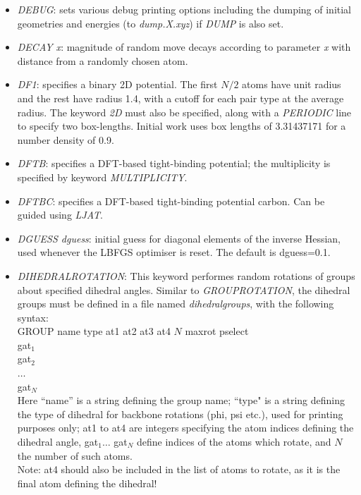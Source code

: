 \documentclass[12pt,a4paper,dvips]{article}
\begin{document}
\begin{itemize}
\item {\it DEBUG\/}: sets various debug printing options including the dumping of initial
geometries and energies (to {\it dump.X.xyz\/}) if {\it DUMP} is also set.

\item {\it DECAY x\/}: magnitude of random move decays according to parameter
{\it x\/} with distance from a randomly chosen atom.

\item {\it DF1\/}: specifies a binary 2D potential.
The first $N/2$ atoms have unit radius and the rest
have radius 1.4, with a cutoff for each pair type at the
average radius.
The keyword {\it 2D\/} must also be specified, along with a
{\it PERIODIC\/} line to specify two box-lengths.
Initial work uses box lengths of 3.31437171 for a number density of 0.9.

\item {\it DFTB\/}: specifies a DFT-based tight-binding potential; the multiplicity is specified by
keyword {\it MULTIPLICITY\/}.

\item {\it DFTBC\/}: specifies a DFT-based tight-binding potential carbon.
Can be guided using {\it LJAT\/}.

\item {\it DGUESS dguess\/}: initial guess for diagonal elements of the inverse
      Hessian, used whenever the LBFGS optimiser is reset. 
      The default is dguess=0.1.

\item {\it DIHEDRALROTATION}: This keyword performes random rotations of groups about specified dihedral angles. Similar to {\it GROUPROTATION}, the dihedral groups must be defined in a file named {\it dihedralgroups}, with the following syntax:\\
GROUP name type at1 at2 at3 at4 $N$ maxrot pselect\\
gat$_1$\\
gat$_2$\\
$\ldots$\\
gat$_N$\\
Here ``name'' is a string defining the group name; ``type" is a string defining the type of dihedral for backbone rotations (phi, psi etc.), used for printing purposes only; at1 to at4 are integers specifying the atom indices defining the dihedral angle, gat$_1 \ldots$ gat$_N$ define indices of the atoms which rotate, and $N$ the number of such atoms.\\
Note: at4 should also be included in the list of atoms to rotate, as it is the final atom defining the dihedral!


\end{itemize}
\end{document}

